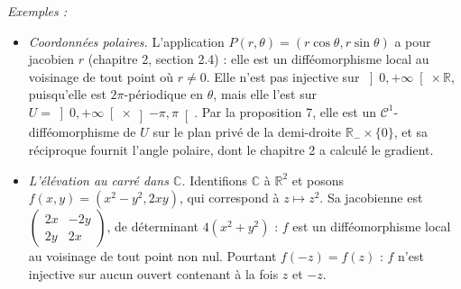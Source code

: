 \documentclass[a4paper,twoside]{report}
\newenvironment{exemples}%
 {\par\needspace{6\baselineskip}\vspace{1mm}\begin{list}{}{\leftmargin=1cm \rightmargin=0.5cm}\item[]%
  \textit{Exemples :}%
  \begin{itemize}[label=$\bullet$,leftmargin=0.45cm,topsep=3pt,itemsep=4pt]}%
 {\end{itemize}\end{list}\vspace{1mm}}
\newcommand{\R}{\mathbb{R}}
\newcommand{\C}{\mathbb{C}}
\newcommand{\Cc}{\mathcal{C}}                     %
\begin{document}
\begin{exemples}
  \item \emph{Coordonnées polaires.} L'application $P(r, \theta) = (r\cos\theta, r\sin\theta)$ a pour jacobien $r$ (chapitre 2, section 2.4) : elle est un difféomorphisme local au voisinage de tout point où $r \neq 0$. Elle n'est pas injective sur $\left]0, +\infty\right[ \times \R$, puisqu'elle est $2\pi$-périodique en $\theta$, mais elle l'est sur $U = \left]0, +\infty\right[ \times \left]-\pi, \pi\right[$. Par la proposition 7, elle est un $\Cc^{1}$-difféomorphisme de $U$ sur le plan privé de la demi-droite $\R_{-} \times \{0\}$, et sa réciproque fournit l'angle polaire, dont le chapitre 2 a calculé le gradient.
  \item \emph{L'élévation au carré dans $\C$.} Identifions $\C$ à $\R^{2}$ et posons $f(x, y) = (x^{2} - y^{2}, 2xy)$, qui correspond à $z \mapsto z^{2}$. Sa jacobienne est $\begin{pmatrix} 2x & -2y \\ 2y & 2x \end{pmatrix}$, de déterminant $4(x^{2} + y^{2})$ : $f$ est un difféomorphisme local au voisinage de tout point non nul. Pourtant $f(-z) = f(z)$ : $f$ n'est injective sur aucun ouvert contenant à la fois $z$ et $-z$.
\end{exemples}
\end{document}
